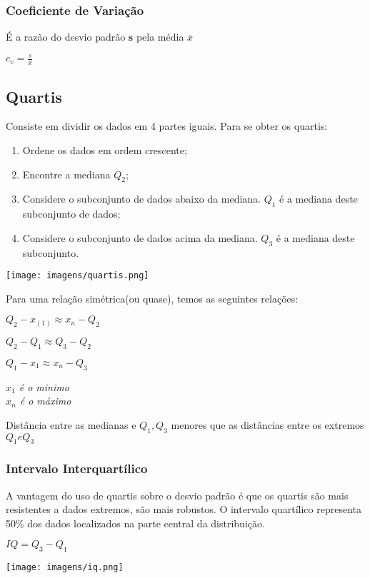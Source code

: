 \documentclass[a4paper, 12pt]{article}
\begin{document}
\subsubsection{Coeficiente de Variação}
	É a razão do desvio padrão \textbf{s} pela média $\overline{x}$
	\begin{center}
		\LARGE
		$
		c_{v} = \frac{s}{\overline{x}}
		$
	\end{center}

\subsection{Quartis}
	Consiste em dividir os dados em 4 partes iguais.
	Para se obter os quartis:
	\begin{enumerate}
		\item Ordene os dados em ordem crescente;
		\item Encontre a mediana $Q_{2}$;
		\item Considere o subconjunto de dados abaixo da mediana. $Q_{1}$ é a mediana deste subconjunto de dados;
		\item Considere o subconjunto de dados acima da mediana. $Q_{3}$ é a mediana deste subconjunto.
	\end{enumerate}
	\begin{center}
		\texttt{[image: imagens/quartis.png]}
	\end{center}
	Para uma relação simétrica(ou quase), temos as seguintes relações:
	\begin{center}
		$Q_{2} - x_{(1)} \approx x_{n} - Q_{2}$
		
		$Q_{2} - Q_{1} \approx Q_{3}-Q_{2}$
		
		$Q_{1} - x_{1} \approx x_{n}-Q_{3}$
	\end{center}
	\begin{flushright}
		\textit{$x_{1}$ é o minimo\\
		$x_{n}$ é o máximo}
	\end{flushright}
	Distância entre as medianas e $Q_{1}, Q_{3}$ menores que as distâncias entre os extremos $Q_{1} e Q_{3}$

\subsubsection{Intervalo Interquartílico}
	A vantagem do uso de quartis sobre o desvio padrão é que os quartis são mais resistentes a dados extremos, são mais robustos.
	O intervalo quartílico representa 50\% dos dados localizados na parte central da distribuição.
	\begin{center}
		\LARGE
		$IQ = Q_{3} - Q_{1}$
	\end{center}
	\begin{center}
		\texttt{[image: imagens/iq.png]}
	\end{center}
	
\end{document}
